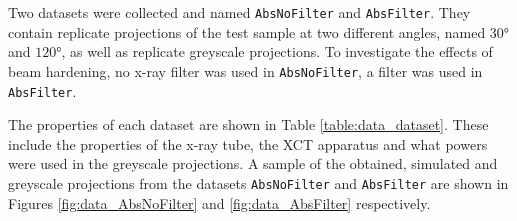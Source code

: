 Two datasets were collected and named \texttt{AbsNoFilter} and \texttt{AbsFilter}. They contain replicate projections of the test sample at two different angles, named $\ang{30}$ and $\ang{120}$, as well as replicate greyscale projections. To investigate the effects of beam hardening, no x-ray filter was used in \texttt{AbsNoFilter}, a filter was used in \texttt{AbsFilter}.

The properties of each dataset are shown in Table \ref{table:data_dataset}. These include the properties of the x-ray tube, the XCT apparatus and what powers were used in the greyscale projections. A sample of the obtained, simulated and greyscale projections from the datasets \texttt{AbsNoFilter} and \texttt{AbsFilter} are shown in Figures \ref{fig:data_AbsNoFilter} and \ref{fig:data_AbsFilter} respectively.

